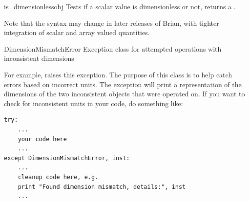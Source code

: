 \documentclass[letterpaper,10pt]{manual}
\begin{document}
\hypertarget{brian.is_dimensionless}{}\begin{funcdesc}{is\_dimensionless}{obj}
Tests if a scalar value is dimensionless or not, returns a .

Note that the syntax may change in later releases of Brian, with tighter
integration of scalar and array valued quantities.
\end{funcdesc}

\hypertarget{brian.DimensionMismatchError}{}\begin{excdesc}{DimensionMismatchError}
Exception class for attempted operations with inconsistent dimensions

For example,  raises this exception. The purpose of this
class is to help catch errors based on incorrect units. The exception will
print a representation of the dimensions of the two inconsistent objects
that were operated on. If you want to check for inconsistent units in your
code, do something like:

\begin{Verbatim}[commandchars=@\[\]]
try:
    ...
    your code here
    ...
except DimensionMismatchError, inst:
    ...
    cleanup code here, e.g.
    print "Found dimension mismatch, details:", inst
    ...
\end{Verbatim}
\end{excdesc}
\end{document}
